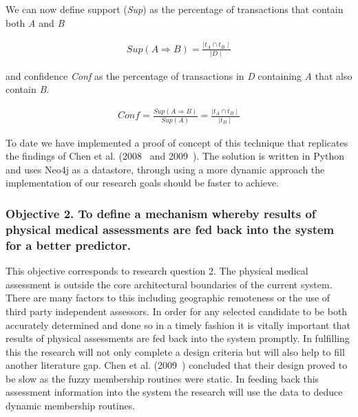 We can now define support (\textit{Sup}) as the percentage of transactions that contain both \textit{A} and \textit{B}


\begin{align}
    \textit{Sup}(\textit{A} \Rightarrow \textit{B}) = \frac{\mid \textit{t}_A \cap \textit{t}_B \mid}{\mid \textit{D} \mid}
\end{align}


and confidence \textit{Conf} as the percentage of transactions in \textit{D} containing \textit{A} that also contain \textit{B}.

\begin{align}
    \textit{Conf} = \frac{\textit{Sup}(\textit{A} \Rightarrow \textit{B})}{\textit{Sup}(\textit{A})} = \frac{\mid \textit{t}_A \cap \textit{t}_B \mid}{\mid \textit{t}_B \mid}
\end{align}

To date we have implemented a proof of concept of this technique that replicates the findings of Chen et al. (2008~\cite{chen2008mining} and 2009~\cite{chen2009mining}).
The solution is written in Python and uses Neo4j as a datastore, through using a more dynamic approach the implementation of our research goals should be faster to achieve.


\subsubsection{Objective 2. To define a mechanism whereby results of physical medical assessments are fed back into the system for a better predictor.}

This objective corresponds to research question 2. The physical medical assessment is outside the core architectural boundaries of the current system. There are many factors to this including geographic remoteness or the use of third party independent assessors. In order for any selected candidate to be both accurately determined and done so in a timely fashion it is vitally important that results of physical assessments are fed back into the system promptly. In fulfilling this the research will not only complete a design criteria but will also help to fill another literature gap. Chen et al. (2009~\cite{chen2009mining}) concluded that their design proved to be slow as the fuzzy membership routines were static. In feeding back this assessment information into the system the research will use the data to deduce dynamic membership routines.


